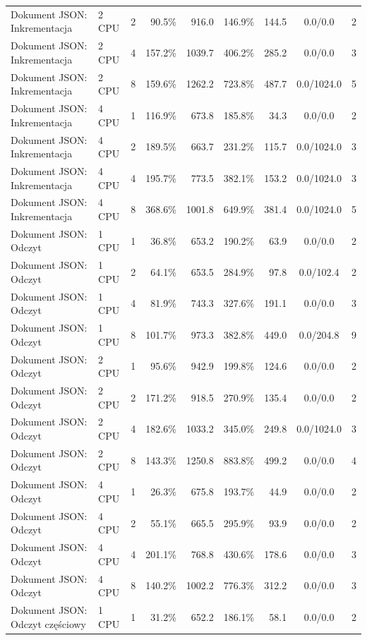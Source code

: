 \begin{table}[ht]
{\begin{tabular}{llcrrrrcc}
Dokument JSON: Inkrementacja & 2 CPU & 2 & 90.5\% & 916.0 & 146.9\% & 144.5 & 0.0/0.0 & 2 \\
Dokument JSON: Inkrementacja & 2 CPU & 4 & 157.2\% & 1039.7 & 406.2\% & 285.2 & 0.0/0.0 & 3 \\
Dokument JSON: Inkrementacja & 2 CPU & 8 & 159.6\% & 1262.2 & 723.8\% & 487.7 & 0.0/1024.0 & 5 \\
Dokument JSON: Inkrementacja & 4 CPU & 1 & 116.9\% & 673.8 & 185.8\% & 34.3 & 0.0/0.0 & 2 \\
Dokument JSON: Inkrementacja & 4 CPU & 2 & 189.5\% & 663.7 & 231.2\% & 115.7 & 0.0/1024.0 & 3 \\
Dokument JSON: Inkrementacja & 4 CPU & 4 & 195.7\% & 773.5 & 382.1\% & 153.2 & 0.0/1024.0 & 3 \\
Dokument JSON: Inkrementacja & 4 CPU & 8 & 368.6\% & 1001.8 & 649.9\% & 381.4 & 0.0/1024.0 & 5 \\
Dokument JSON: Odczyt & 1 CPU & 1 & 36.8\% & 653.2 & 190.2\% & 63.9 & 0.0/0.0 & 2 \\
Dokument JSON: Odczyt & 1 CPU & 2 & 64.1\% & 653.5 & 284.9\% & 97.8 & 0.0/102.4 & 2 \\
Dokument JSON: Odczyt & 1 CPU & 4 & 81.9\% & 743.3 & 327.6\% & 191.1 & 0.0/0.0 & 3 \\
Dokument JSON: Odczyt & 1 CPU & 8 & 101.7\% & 973.3 & 382.8\% & 449.0 & 0.0/204.8 & 9 \\
Dokument JSON: Odczyt & 2 CPU & 1 & 95.6\% & 942.9 & 199.8\% & 124.6 & 0.0/0.0 & 2 \\
Dokument JSON: Odczyt & 2 CPU & 2 & 171.2\% & 918.5 & 270.9\% & 135.4 & 0.0/0.0 & 2 \\
Dokument JSON: Odczyt & 2 CPU & 4 & 182.6\% & 1033.2 & 345.0\% & 249.8 & 0.0/1024.0 & 3 \\
Dokument JSON: Odczyt & 2 CPU & 8 & 143.3\% & 1250.8 & 883.8\% & 499.2 & 0.0/0.0 & 4 \\
Dokument JSON: Odczyt & 4 CPU & 1 & 26.3\% & 675.8 & 193.7\% & 44.9 & 0.0/0.0 & 2 \\
Dokument JSON: Odczyt & 4 CPU & 2 & 55.1\% & 665.5 & 295.9\% & 93.9 & 0.0/0.0 & 2 \\
Dokument JSON: Odczyt & 4 CPU & 4 & 201.1\% & 768.8 & 430.6\% & 178.6 & 0.0/0.0 & 3 \\
Dokument JSON: Odczyt & 4 CPU & 8 & 140.2\% & 1002.2 & 776.3\% & 312.2 & 0.0/0.0 & 3 \\
Dokument JSON: Odczyt częściowy & 1 CPU & 1 & 31.2\% & 652.2 & 186.1\% & 58.1 & 0.0/0.0 & 2 \\

\end{tabular}}
\end{table}
